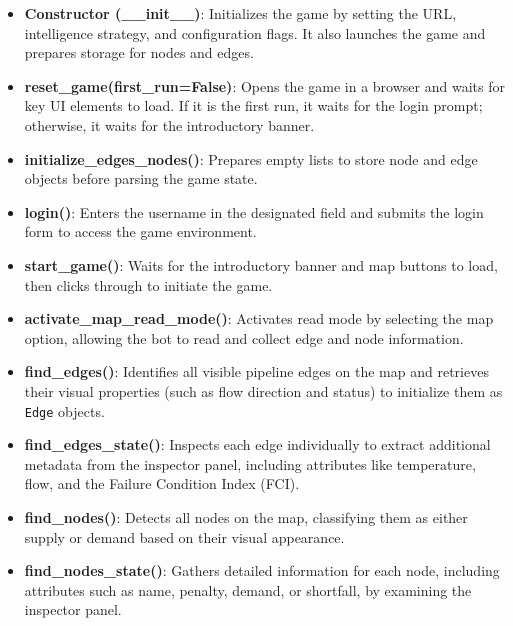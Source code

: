 \documentclass[12pt,a4paper]{report}
\begin{document}
        \begin{itemize}
            \item \textbf{Constructor (\_\_init\_\_)}: Initializes the game by setting the URL, intelligence strategy, and configuration flags. It also launches the game and prepares storage for nodes and edges.
            
            \item \textbf{reset\_game(first\_run=False)}: Opens the game in a browser and waits for key UI elements to load. If it is the first run, it waits for the login prompt; otherwise, it waits for the introductory banner.

            \item \textbf{initialize\_edges\_nodes()}: Prepares empty lists to store node and edge objects before parsing the game state.
            
            \item \textbf{login()}: Enters the username in the designated field and submits the login form to access the game environment.
            
            \item \textbf{start\_game()}: Waits for the introductory banner and map buttons to load, then clicks through to initiate the game.
            
            \item \textbf{activate\_map\_read\_mode()}: Activates read mode by selecting the map option, allowing the bot to read and collect edge and node information.
            
            \item \textbf{find\_edges()}: Identifies all visible pipeline edges on the map and retrieves their visual properties (such as flow direction and status) to initialize them as \texttt{Edge} objects.
            
            \item \textbf{find\_edges\_state()}: Inspects each edge individually to extract additional metadata from the inspector panel, including attributes like temperature, flow, and the Failure Condition Index (FCI).
            
            \item \textbf{find\_nodes()}: Detects all nodes on the map, classifying them as either supply or demand based on their visual appearance.
            
            \item \textbf{find\_nodes\_state()}: Gathers detailed information for each node, including attributes such as name, penalty, demand, or shortfall, by examining the inspector panel.
            

\end{itemize}
\end{document}
